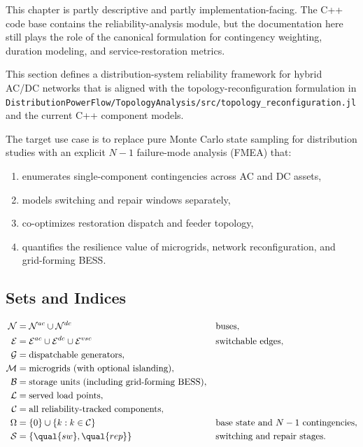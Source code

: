 This chapter is partly descriptive and partly implementation-facing.  The C++
code base contains the reliability-analysis module, but the documentation here
still plays the role of the canonical formulation for contingency weighting,
duration modeling, and service-restoration metrics.

This section defines a distribution-system reliability framework for hybrid AC/DC
networks that is aligned with the topology-reconfiguration formulation in
\texttt{DistributionPowerFlow/TopologyAnalysis/src/topology\_reconfiguration.jl}
and the current C++ component models.

The target use case is to replace pure Monte Carlo state sampling for
distribution studies with an explicit \(N-1\) failure-mode analysis (FMEA) that:
\begin{enumerate}
  \item enumerates single-component contingencies across AC and DC assets,
  \item models switching and repair windows separately,
  \item co-optimizes restoration dispatch and feeder topology,
  \item quantifies the resilience value of microgrids, network reconfiguration,
        and grid-forming BESS.
\end{enumerate}

\subsection{Sets and Indices}

\begin{align}
\mathcal{N} &= \mathcal{N}^{ac} \cup \mathcal{N}^{dc} && \text{buses}, \\
\mathcal{E} &= \mathcal{E}^{ac} \cup \mathcal{E}^{dc} \cup \mathcal{E}^{vsc} && \text{switchable edges}, \\
\mathcal{G} &= \text{dispatchable generators}, \\
\mathcal{M} &= \text{microgrids (with optional islanding)}, \\
\mathcal{B} &= \text{storage units (including grid-forming BESS)}, \\
\mathcal{L} &= \text{served load points}, \\
\mathcal{C} &= \text{all reliability-tracked components}, \\
\Omega &= \{0\} \cup \{k: k\in\mathcal{C}\} && \text{base state and }N-1\text{ contingencies}, \\
\mathcal{S} &= \{\qual{sw},\qual{rep}\} && \text{switching and repair stages}.
\end{align}

